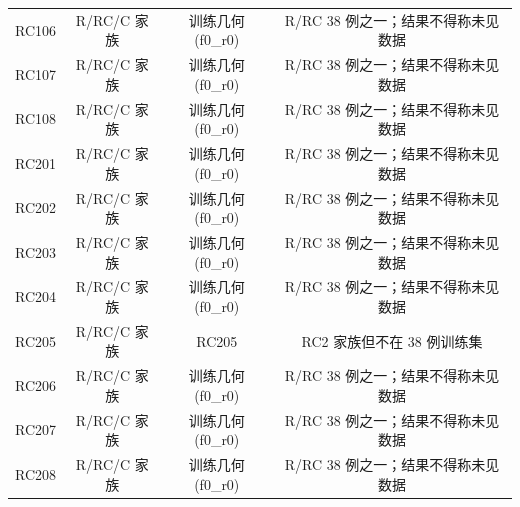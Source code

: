 \begin{table}[htbp]
\begin{tabular}{lccc}
RC106 & R/RC/C 家族 & 训练几何(f0_r0) & R/RC 38 例之一；结果不得称未见数据 \\
RC107 & R/RC/C 家族 & 训练几何(f0_r0) & R/RC 38 例之一；结果不得称未见数据 \\
RC108 & R/RC/C 家族 & 训练几何(f0_r0) & R/RC 38 例之一；结果不得称未见数据 \\
RC201 & R/RC/C 家族 & 训练几何(f0_r0) & R/RC 38 例之一；结果不得称未见数据 \\
RC202 & R/RC/C 家族 & 训练几何(f0_r0) & R/RC 38 例之一；结果不得称未见数据 \\
RC203 & R/RC/C 家族 & 训练几何(f0_r0) & R/RC 38 例之一；结果不得称未见数据 \\
RC204 & R/RC/C 家族 & 训练几何(f0_r0) & R/RC 38 例之一；结果不得称未见数据 \\
RC205 & R/RC/C 家族 & RC205 & RC2 家族但不在 38 例训练集 \\
RC206 & R/RC/C 家族 & 训练几何(f0_r0) & R/RC 38 例之一；结果不得称未见数据 \\
RC207 & R/RC/C 家族 & 训练几何(f0_r0) & R/RC 38 例之一；结果不得称未见数据 \\
RC208 & R/RC/C 家族 & 训练几何(f0_r0) & R/RC 38 例之一；结果不得称未见数据 \\
\bottomrule
\end{tabular}
\end{table}
